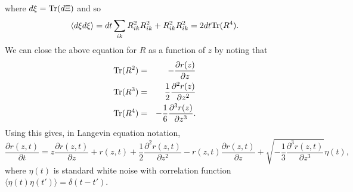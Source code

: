 \documentclass[11pt]{report}
\begin{document}
where $d\xi = {\rm Tr}( d\Xi)$ and so
\begin{equation}
\langle d\xi d\xi\rangle = dt \sum_{ik} R^2_{ik}R^2_{ik}  +  R^2_{ik}R^2_{ik} = 2dt  {\rm Tr} (R^4).
\end{equation}
We can close the above equation for $R$ as a function of $z$ by noting that
\begin{eqnarray}
{\rm Tr}(R^2) &=& -\frac{\partial r(z)}{\partial z}\nonumber \\
{\rm Tr}(R^3) &=& \frac{1}{2}\frac{\partial^2 r(z)}{\partial z^2} \nonumber \\
{\rm Tr}(R^4) &=&- \frac{1}{6}\frac{\partial^3 r(z)}{\partial z^3} .
\end{eqnarray}
Using this gives, in Langevin equation notation, 
\begin{equation}
\frac{\partial r(z,t)}{\partial t} = z\frac{\partial r(z,t)}{\partial z} + r(z,t) + \frac{1}{2}\frac{\partial^2 r(z,t)}{\partial z^2} - r(z,t) \frac{\partial r(z,t)}{\partial z} + \sqrt{- \frac{1}{3}\frac{\partial^3 r(z,t)}{\partial z^3}} \eta(t),
\end{equation}
where $\eta(t)$ is standard white noise with correlation function $\langle \eta(t)\eta(t')\rangle=\delta(t-t')$.
\end{document}
